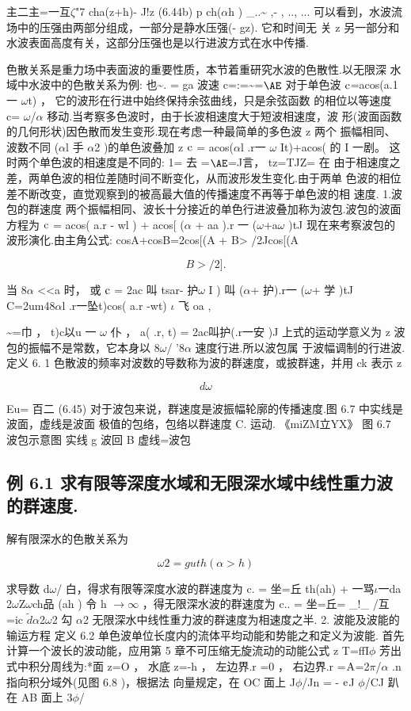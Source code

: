 主二主=一互$\zeta$"7 cha(z+h)- J!z (6.44b) p ch($\alpha$h ) \_..\textasciitilde{} ,- , .., ... 可以看到，水波流场中的压强由两部分组成，一部分是静水压强(- gz). 它和时间无 关 z 另一部分和水波表面高度有关，这部分压强也是以行进波方式在水中传播.

色散关系是重力场中表面波的重要性质，本节着重研究水波的色散性.以无限深 水域中水波中的色散关系为例: 也\textasciitilde{}. = ga 波速 c=:=\textasciitilde{}=${\rm Æ}$ 对于单色波 ${\rm c}$=acos(a.1 一 $\omega$t) ， 它的波形在行进中始终保持余弦曲线，只是余弦函数 的相位以等速度 c= $\omega$/$\alpha$ 移动.当考察多色波时，由于长波相速度大于短波相速度，波 形(波面函数的几何形状)因色散而发生变形.现在考虑一种最简单的多色波 z 两个 振幅相同、波数不同 ($\alpha$l 手 $\alpha$2 )的单色波叠加 z ${\rm c}$ = acos($\alpha$l .r一 $\omega$ It)+acos( 的 I 一剧。 这时两个单色波的相速度是不同的: 1= 去 =${\rm Æ}$=J言， tz=TJZ= 在 由于相速度之差，两单色波的相位差随时间不断变化，从而波形发生变化.由于两单 色波的相位差不断改变，直觉观察到的被高最大值的传播速度不再等于单色波的相 速度. 1.波包的群速度 两个振幅相同、波长十分接近的单色行进波叠加称为波包.波包的波面方程为 ${\rm c}$ = acos( a.r - wl ) + acos[ ($\alpha$ + aa ).r 一 ($\omega$+a$\omega$ )tJ 现在来考察波包的波形演化.由主角公式: cosA+cosB=2cos[(A + B> /2Jcos[(A

\[B> /2].\]

当 8$\alpha$ <<a 时， 或 ${\rm c}$ = 2ac 叫 tsar- 护$\omega$ I ) 叫 ($\alpha$+ 护).r一 ($\omega$+ 学 )tJ C=2um48$\alpha$l .r一坠t)cos( a.r -wt) $\iota$ 飞 oa ,

\textasciitilde{}=巾 ， t)c以u 一 $\omega$ 仆 ， a( .r, t) = 2ac叫护(.r一安 )J 上式的运动学意义为 z 波包的振幅不是常数，它本身以 8$\omega$/ '8$\alpha$ 速度行进.所以波包属 于波幅调制的行进波. 定义 6. 1 色散波的频率对波数的导数称为波的群速度，或披群速，并用 ck 表示 z

\[d\omega \]

Eu= 百二 (6.45) 对于波包来说，群速度是波振幅轮廓的传播速度.图 6.7 中实线是波面，虚线是波面 极值的包络，包络以群速度 C. 运动. 《miZM立YX》 图 6.7 波包示意图 实线 g 波回 B 虚线=波包

\subsection*{例 6.1  求有限等深度水域和无限深水域中线性重力波的群速度.}

解有限深水的色散关系为

\[\omega 2 =guth(\alpha >h)\]

求导数 d$\omega$/ 白，得求有限等深度水波的群速度为 c. = 坐=丘 th(ah) + 一骂$\iota$一da 2$\omega$Z$\omega$ch品 (ah ) 令 h $\rightarrow$$\infty$ ，得无限深水波的群速度为 c.. = 坐=丘= \_!\_ /互 =ic $\tilde{d}$$\alpha$2$\omega$2 勾 $\alpha$2 无限深水中线性重力波的群速度为相速度之半. 2. 波能及波能的输运方程 定义 6.2 单色波单位长度内的流体平均动能和势能之和定义为波能. 首先计算一个波长的波动能，应用第 5 章不可压缩无旋流动的动能公式 z T=ffI$\phi$ 芳出 式中积分周线为:*面 z=O ， 水底 z=-h ， 左边界.r =0 ， 右边界.r =${\rm A}$=2$\pi$/$\alpha$ .n 指向积分域外(见图 6.8 )，根据法 向量规定，在 OC 面上 J$\phi$/Jn = - ${\rm e}$J $\phi$/CJ 趴在 AB 面上 3$\phi$/

